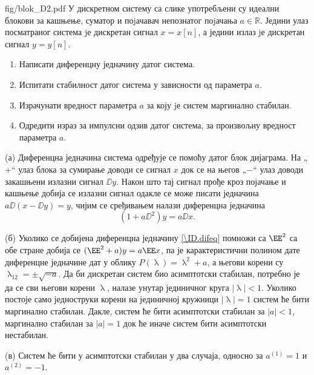 \begin{slikaDesno}{fig/blok_D2.pdf}
    \PID У дискретном систему са слике употребљени су идеални блокови за кашњење,
    суматор и поjачавач непознатог поjачања $a \in \mathbb R$. 
    Једини улаз посматраног
    система jе дискретан сигнал $x = x[n]$, а једини излаз jе дискретан сигнал $y = y[n]$.
\end{slikaDesno}
\begin{enumerate}[label=(\alph*)]
    \item Написати диференцну једначину датог система.
    \item Испитати  стабилност датог система у зависности од параметра $a$.
    \item Израчунати вредност параметра $a$ за коју jе систем маргинално стабилан.
    \item Одредити израз за импулсни одзив датог система, за произвољну вредност параметра $a$.
\end{enumerate}

\RESENJE
(а) Диференцна једначина система одређује се помоћу датог блок дијаграма. На „$+$“ улаз блока за сумирање 
доводи се сигнал $x$ док се на његов „$-$“ улаз доводи закашњени излазни сигнал $\DD y$. Након што 
тај сигнал прође кроз појачање и кашњење добија се излазни сигнал одакле се може писати 
једначина $a \DD ( x - \DD y) = y$, чијим се сређивањем налази диференцна једначина 
\begin{equation}
    (1 + a \DD^2) y = a \DD x. \label{\ID.difeq}
\end{equation}

(б) Уколико се добијена диференцна једначину \eqref{\ID.difeq} помножи са $\EE^2$ са обе стране добија се 
$(\EE^2 + a)y = a \EE x$, па је карактеристични полином дате диференцне једначине дат у облику 
$P(\uplambda) = \uplambda^2 + a$, а његови корени су 
$\uplambda_{12} = \pm \sqrt{-a}$. Да би дискретан систем био асимптотски стабилан, потребно је да се сви његови 
корени $\uplambda$, налазе унутар јединичног круга $|\uplambda| < 1$. Уколико постоје само 
једноструки корени на јединичној 
кружници $|\uplambda| = 1$ систем ће бити маргинално стабилан. 
Дакле, систем ће бити асимптотски стабилан за $|a| < 1$, маргинално стабилан за $|a| = 1$ док ће иначе 
систем бити асимптотски нестабилан.

(в) Систем ће бити у асимптотски стабилан у два случаја, односно за $a^{(1)} = 1$ и $a^{(2)} = -1$.  

